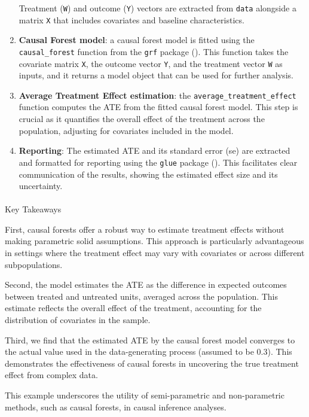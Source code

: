 \documentclass[
  singlecolumn]{article}
\makeatletter
\let\oldparagraph\paragraph
\renewcommand{\paragraph}{
    \@ifstar
      \xxxParagraphStar
      \xxxParagraphNoStar
  }
\newcommand{\xxxParagraphStar}[1]{\oldparagraph*{#1}\mbox{}}
\newcommand{\xxxParagraphNoStar}[1]{\oldparagraph{#1}\mbox{}}
\makeatother
\begin{document}
\begin{enumerate}
  Treatment (\texttt{W}) and outcome (\texttt{Y}) vectors are extracted
  from \texttt{data} alongside a matrix \texttt{X} that includes
  covariates and baseline characteristics.
\item
  \textbf{Causal Forest model}: a causal forest model is fitted using
  the \texttt{causal\_forest} function from the \texttt{grf} package
  (). This function
  takes the covariate matrix \texttt{X}, the outcome vector \texttt{Y},
  and the treatment vector \texttt{W} as inputs, and it returns a model
  object that can be used for further analysis.
\item
  \textbf{Average Treatment Effect estimation}: the
  \texttt{average\_treatment\_effect} function computes the ATE from the
  fitted causal forest model. This step is crucial as it quantifies the
  overall effect of the treatment across the population, adjusting for
  covariates included in the model.
\item
  \textbf{Reporting}: The estimated ATE and its standard error (se) are
  extracted and formatted for reporting using the \texttt{glue} package
  (). This
  facilitates clear communication of the results, showing the estimated
  effect size and its uncertainty.
\end{enumerate}

\paragraph{Key Takeaways}\label{key-takeaways}

First, causal forests offer a robust way to estimate treatment effects
without making parametric solid assumptions. This approach is
particularly advantageous in settings where the treatment effect may
vary with covariates or across different subpopulations.

Second, the model estimates the ATE as the difference in expected
outcomes between treated and untreated units, averaged across the
population. This estimate reflects the overall effect of the treatment,
accounting for the distribution of covariates in the sample.

Third, we find that the estimated ATE by the causal forest model
converges to the actual value used in the data-generating process
(assumed to be 0.3). This demonstrates the effectiveness of causal
forests in uncovering the true treatment effect from complex data.

This example underscores the utility of semi-parametric and
non-parametric methods, such as causal forests, in causal inference
analyses.
\end{document}
